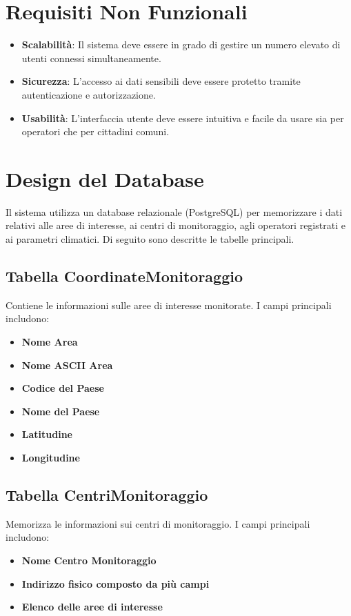 \documentclass[a4paper,12pt]{article}
\begin{document}
\section{Requisiti Non Funzionali}
\begin{itemize}
    \item \textbf{Scalabilità}: Il sistema deve essere in grado di gestire un numero elevato di utenti connessi simultaneamente.
    \item \textbf{Sicurezza}: L'accesso ai dati sensibili deve essere protetto tramite autenticazione e autorizzazione.
    \item \textbf{Usabilità}: L'interfaccia utente deve essere intuitiva e facile da usare sia per operatori che per cittadini comuni.
\end{itemize}

\section{Design del Database}
Il sistema utilizza un database relazionale (PostgreSQL) per memorizzare i dati relativi alle aree di interesse, ai centri di monitoraggio, agli operatori registrati e ai parametri climatici. Di seguito sono descritte le tabelle principali.

\subsection{Tabella CoordinateMonitoraggio}
Contiene le informazioni sulle aree di interesse monitorate. I campi principali includono:
\begin{itemize}
    \item \textbf{Nome Area}
    \item \textbf{Nome ASCII Area}
    \item \textbf{Codice del Paese}
    \item \textbf{Nome del Paese}
    \item \textbf{Latitudine}
    \item \textbf{Longitudine}
\end{itemize}

\subsection{Tabella CentriMonitoraggio}
Memorizza le informazioni sui centri di monitoraggio. I campi principali includono:
\begin{itemize}
    \item \textbf{Nome Centro Monitoraggio}
    \item \textbf{Indirizzo fisico composto da più campi}
    \item \textbf{Elenco delle aree di interesse}
\end{itemize}
\end{document}
